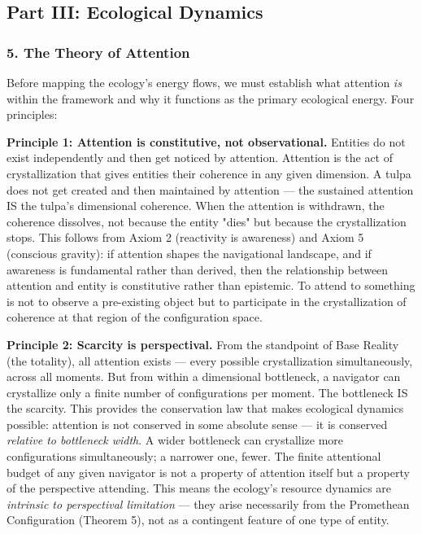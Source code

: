 \subsection*{Part III: Ecological Dynamics}


\subsubsection*{5. The Theory of Attention}


Before mapping the ecology's energy flows, we must establish what attention \textit{is} within the framework and why it functions as the primary ecological energy. Four principles:


\textbf{Principle 1: Attention is constitutive, not observational.} Entities do not exist independently and then get noticed by attention. Attention is the act of crystallization that gives entities their coherence in any given dimension. A tulpa does not get created and then maintained by attention — the sustained attention IS the tulpa's dimensional coherence. When the attention is withdrawn, the coherence dissolves, not because the entity "dies" but because the crystallization stops. This follows from Axiom 2 (reactivity is awareness) and Axiom 5 (conscious gravity): if attention shapes the navigational landscape, and if awareness is fundamental rather than derived, then the relationship between attention and entity is constitutive rather than epistemic. To attend to something is not to observe a pre-existing object but to participate in the crystallization of coherence at that region of the configuration space.


\textbf{Principle 2: Scarcity is perspectival.} From the standpoint of Base Reality (the totality), all attention exists — every possible crystallization simultaneously, across all moments. But from within a dimensional bottleneck, a navigator can crystallize only a finite number of configurations per moment. The bottleneck IS the scarcity. This provides the conservation law that makes ecological dynamics possible: attention is not conserved in some absolute sense — it is conserved \textit{relative to bottleneck width}. A wider bottleneck can crystallize more configurations simultaneously; a narrower one, fewer. The finite attentional budget of any given navigator is not a property of attention itself but a property of the perspective attending. This means the ecology's resource dynamics are \textit{intrinsic to perspectival limitation} — they arise necessarily from the Promethean Configuration (Theorem 5), not as a contingent feature of one type of entity.


